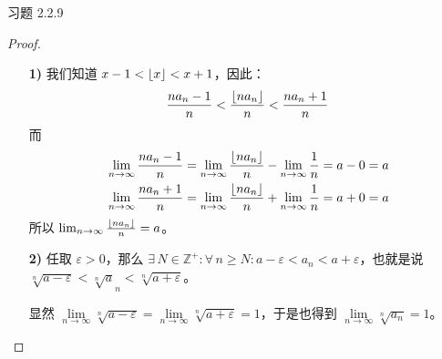 \begin{problem}
	习题 2.2.9
	\begin{proof}
		\begin{enumerate}
			\item[\textbf{1)}] 我们知道 $x - 1 < \lfloor x\rfloor < x + 1$，因此：
			$$
			\frac{n a_n - 1}{n} < \frac{\lfloor n a_n\rfloor}{n} < \frac{n a_n + 1}{n}
			$$
			而
			$$
			\begin{aligned}
				& \lim_{n \to \infty} \frac{n a_n - 1}{n} = \lim_{n \to \infty} \frac{\lfloor n a_n\rfloor}{n} - \lim_{n \to \infty} \frac{1}{n} = a - 0 = a \\
				& \lim_{n \to \infty} \frac{n a_n + 1}{n} = \lim_{n \to \infty} \frac{\lfloor n a_n\rfloor}{n} + \lim_{n \to \infty} \frac{1}{n} = a + 0 = a
			\end{aligned}
			$$
			所以 $\lim_{n \to \infty} \frac{\lfloor n a_n\rfloor}{n} = a$。

			\item[\textbf{2)}] 任取 $\varepsilon > 0$，那么 $\exists\,N \in \mathbb{Z}^+: \forall\,n \geq N: a - \varepsilon < a_n < a + \varepsilon$，也就是说 $\sqrt[n]{a - \varepsilon} < \sqrt[n] a_n < \sqrt[n]{a + \varepsilon}$。

			显然 $\lim\limits_{n \to \infty} \sqrt[n]{a - \varepsilon} = \lim\limits_{n \to \infty} \sqrt[n]{a + \varepsilon} = 1$，于是也得到 $\lim\limits_{n \to \infty} \sqrt[n]{a_n} = 1$。
		\end{enumerate}
	\end{proof}
\end{problem}